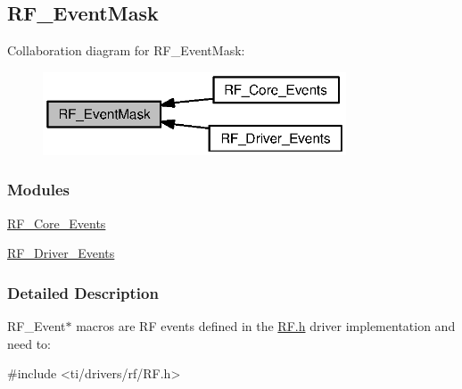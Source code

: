 \subsection{R\+F\+\_\+\+Event\+Mask}
\label{group___r_f___event_mask}
Collaboration diagram for R\+F\+\_\+\+Event\+Mask\+:
\nopagebreak
\begin{figure}[H]
\begin{center}
\leavevmode
\includegraphics[width=255pt]{group___r_f___event_mask}
\end{center}
\end{figure}
\subsubsection*{Modules}
\begin{DoxyCompactItemize}
\item 
\hyperlink{group___r_f___core___events}{R\+F\+\_\+\+Core\+\_\+\+Events}
\item 
\hyperlink{group___r_f___driver___events}{R\+F\+\_\+\+Driver\+\_\+\+Events}
\end{DoxyCompactItemize}


\subsubsection{Detailed Description}
R\+F\+\_\+\+Event$\ast$ macros are R\+F events defined in the \hyperlink{_r_f_8h}{R\+F.\+h} driver implementation and need to\+: 
\begin{DoxyCode}
\textcolor{preprocessor}{#include <ti/drivers/rf/RF.h>}
\end{DoxyCode}
 